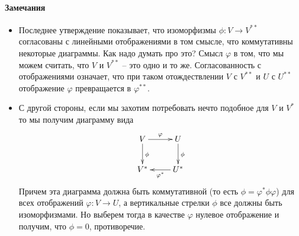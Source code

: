 \paragraph{Замечания}

\begin{itemize}
\item Последнее утверждение показывает, что изоморфизмы $\phi\colon V\to V^{**}$ согласованы с линейными отображениями в том смысле, что коммутативны некоторые диаграммы.
Как надо думать про это?
Смысл $\varphi$ в том, что мы можем считать, что $V$ и $V^{**}$ -- это одно и то же.
Согласованность с отображениями означает, что при таком отождествлении $V$ с $V^{**}$ и $U$ с $U^{**}$ отображение $\varphi$ превращается в $\varphi^{**}$.

\item С другой стороны, если мы захотим потребовать нечто подобное для $V$ и $V^*$ то мы получим диаграмму вида
\[
\xymatrix{
	{V}\ar[r]^{\varphi}\ar[d]^{\phi}&{U}\ar[d]^{\phi}\\
	{V^*}&{U^*}\ar[l]^{\varphi^*}
}
\]
Причем эта диаграмма должна быть коммутативной (то есть $\phi = \varphi^*\phi\varphi$) для всех отображений $\varphi\colon V\to U$, а вертикальные стрелки $\phi$ все должны быть изоморфизмами.
Но выберем тогда в качестве $\varphi$ нулевое отображение и получим, что $\phi = 0$, противоречие.
\end{itemize}
